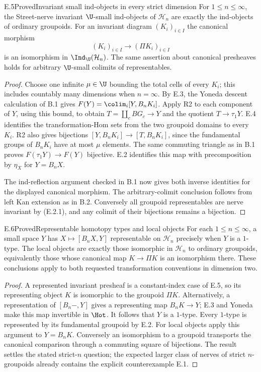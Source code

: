 \begin{claim}{E.5}{Proved}{Invariant small ind-objects in every strict dimension}
For $1\leq n\leq\infty$, the Street-nerve invariant $\U$-small ind-objects of $\mathcal H_n$ are exactly the ind-objects of ordinary groupoids. For an invariant diagram $(K_i)_{i\in I}$ the canonical morphism
\[
 (K_i)_{i\in I}\longrightarrow(\Pi K_i)_{i\in I}
\]
is an isomorphism in $\Ind_\U(\mathcal H_n)$. The same assertion about canonical presheaves holds for arbitrary $\U$-small colimits of representables.
\end{claim}
\begin{proof}
Choose one infinite $\mu\in\U$ bounding the total cells of every $K_i$; this includes countably many dimensions when $n=\infty$. By E.3, the Yoneda descent calculation of B.1 gives $F(Y)=\colim_i[Y,B_nK_i]$. Apply R2 to each component of $Y$, using this bound, to obtain $T=\coprod_cBG_c\to Y$ and the quotient $T\to\tau_1Y$. E.4 identifies the transformation-Hom sets from the two groupoid domains to every $K_i$. R2 also gives bijections $[Y,B_nK_i]\to[T,B_nK_i]$, since the fundamental groups of $B_nK_i$ have at most $\mu$ elements. The same commuting triangle as in B.1 proves $F(\tau_1Y)\to F(Y)$ bijective. E.2 identifies this map with precomposition by $\eta_X$ for $Y=B_nX$.

The ind-reflection argument checked in B.1 now gives both inverse identities for the displayed canonical morphism. The arbitrary-colimit conclusion follows from left Kan extension as in B.2. Conversely all groupoid representables are nerve invariant by (E.2.1), and any colimit of their bijections remains a bijection.
\end{proof}

\begin{claim}{E.6}{Proved}{Representable homotopy types and local objects}
For each $1\leq n\leq\infty$, a small space $Y$ has $X\mapsto[B_nX,Y]$ representable on $\mathcal H_n$ precisely when $Y$ is a $1$-type. The local objects are exactly those isomorphic in $\mathcal H_n$ to ordinary groupoids, equivalently those whose canonical map $K\to\Pi K$ is an isomorphism there. These conclusions apply to both requested transformation conventions in dimension two.
\end{claim}
\begin{proof}
A represented invariant presheaf is a constant-index case of E.5, so its representing object $K$ is isomorphic to the groupoid $\Pi K$. Alternatively, a representation of $[B_n-,Y]$ gives a representing map $B_nK\to Y$; E.3 and Yoneda make this map invertible in $\Hot$. It follows that $Y$ is a $1$-type. Every $1$-type is represented by its fundamental groupoid by E.2. For local objects apply this argument to $Y=B_nK$. Conversely an isomorphism to a groupoid transports the canonical comparison through a commuting square of bijections. The result settles the stated strict-$n$ question; the expected larger class of nerves of strict $n$-groupoids already contains the explicit counterexample E.1.
\end{proof}
